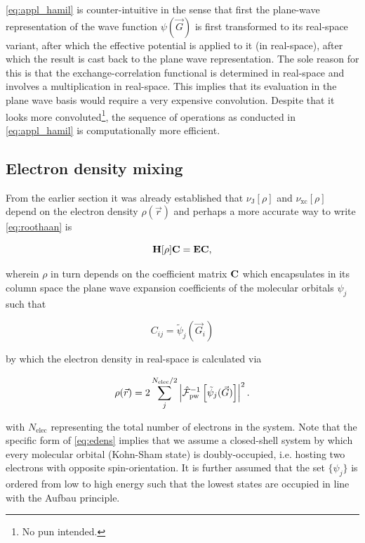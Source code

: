 \cref{eq:appl_hamil} is counter-intuitive in the sense that first the plane-wave representation of the wave function $\psi(\vec{G})$ is first transformed to its real-space variant, after which the effective potential is applied to it (in real-space), after which the result is cast back to the plane wave representation. The sole reason for this is that the exchange-correlation functional is determined in real-space and involves a multiplication in real-space. This implies that its evaluation in the plane wave basis would require a very expensive convolution. Despite that it looks more convoluted\footnote{No pun intended.}, the sequence of operations as conducted in \cref{eq:appl_hamil} is computationally more efficient.

%
%
%
\subsection{Electron density mixing}

From the earlier section it was already established that $\nu_{\text{J}}[\rho]$ and $\nu_{\text{xc}}[\rho]$ depend on the electron density $\rho(\vec{r})$ and perhaps a more accurate way to write \cref{eq:roothaan} is

\begin{equation}
    \mathbf{H}[\rho]\mathbf{C} = \mathbf{E}\mathbf{C},
    \label{eq:roothaan_explicit}
\end{equation}

wherein $\rho$ in turn depends on the coefficient matrix $\mathbf{C}$ which encapsulates in its column space the plane wave expansion coefficients of the molecular orbitals $\psi_{j}$ such that

\begin{equation}
    C_{ij} = \tilde{\psi}_{j}(\vec{G}_{i})
\end{equation}

by which the electron density in real-space is calculated via

\begin{equation}
    \rho(\vec{r}) = 2\sum_{j}^{N_{\text{elec}} / 2} \left|\hat{\mathcal{F}}_{\text{pw}}^{-1} \left[ \tilde{\psi}_{j}(\vec{G}) \right] \right|^{2}.
    \label{eq:edens}
\end{equation}

with $N_{\text{elec}}$ representing the total number of electrons in the system. Note that the specific form of \cref{eq:edens} implies that we assume a closed-shell system by which every molecular orbital (Kohn-Sham state) is doubly-occupied, i.e. hosting two electrons with opposite spin-orientation. It is further assumed that the set $\{ \psi_{j} \}$ is ordered from low to high energy such that the lowest states are occupied in line with the Aufbau principle.

